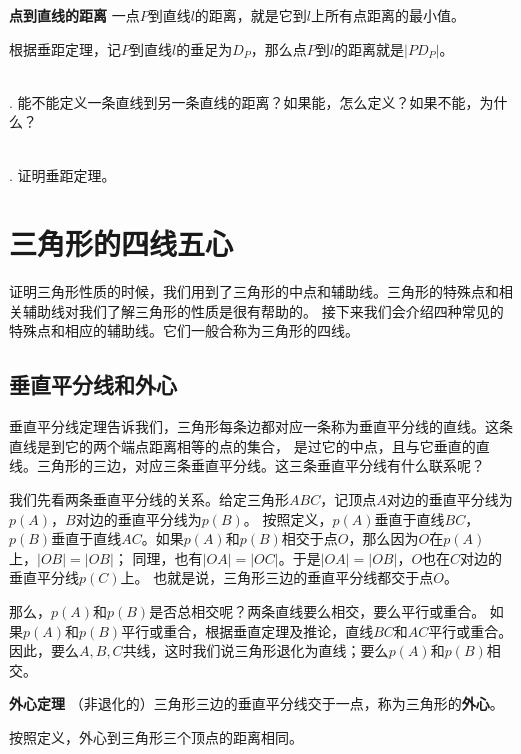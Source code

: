 \documentclass[12pt,UTF8,fontset=none]{ctexbook}
\begin{document}
\begin{df}{\textbf{点到直线的距离}}\label{df:0-2-0}
    一点$P$到直线$l$的距离，就是它到$l$上所有点距离的最小值。
\end{df}
根据垂距定理，记$P$到直线$l$的垂足为$D_P$，那么点$P$到$l$的距离就是$|PD_P|$。

\begin{sk}\label{sk:0-2-0}
    \mbox{} \\
    . 能不能定义一条直线到另一条直线的距离？如果能，怎么定义？如果不能，为什么？
\end{sk}

\begin{xt}\label{xt:0-2-0} 
    \mbox{} \\
    . 证明垂距定理。\\

\end{xt}

\chapter{三角形的四线五心}
证明三角形性质的时候，我们用到了三角形的中点和辅助线。三角形的特殊点和相关辅助线对我们了解三角形的性质是很有帮助的。
接下来我们会介绍四种常见的特殊点和相应的辅助线。它们一般合称为三角形的四线。

\section{垂直平分线和外心}
垂直平分线定理告诉我们，三角形每条边都对应一条称为垂直平分线的直线。这条直线是到它的两个端点距离相等的点的集合，
是过它的中点，且与它垂直的直线。三角形的三边，对应三条垂直平分线。这三条垂直平分线有什么联系呢？

我们先看两条垂直平分线的关系。给定三角形$ABC$，记顶点$A$对边的垂直平分线为$p(A)$，$B$对边的垂直平分线为$p(B)$。
按照定义，$p(A)$垂直于直线$BC$，$p(B)$垂直于直线$AC$。如果$p(A)$和$p(B)$相交于点$O$，那么因为$O$在$p(A)$上，$|OB| = |OB|$；
同理，也有$|OA| = |OC|$。于是$|OA| = |OB|$，$O$也在$C$对边的垂直平分线$p(C)$上。
也就是说，三角形三边的垂直平分线都交于点$O$。

那么，$p(A)$和$p(B)$是否总相交呢？两条直线要么相交，要么平行或重合。
如果$p(A)$和$p(B)$平行或重合，根据垂直定理及推论，直线$BC$和$AC$平行或重合。
因此，要么$A,B,C$共线，这时我们说三角形退化为直线；要么$p(A)$和$p(B)$相交。
\begin{tm}{\textbf{外心定理}}\label{tm:1-0-0}
    （非退化的）三角形三边的垂直平分线交于一点，称为三角形的\textbf{外心}。
\end{tm}
按照定义，外心到三角形三个顶点的距离相同。
\end{document}

